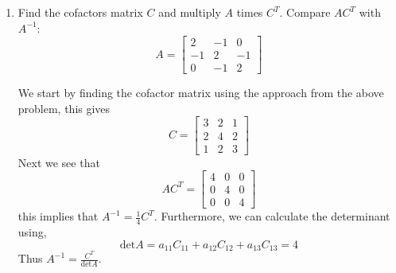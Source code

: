 \begin{enumerate}[label=\arabic*.]
    \item Find the cofactors matrix $C$ and multiply $A$ times $C^{T}$.
        Compare $AC^{T}$ with $A^{-1}$:
        \begin{equation}
            A =
            \begin{bmatrix}
                2 & -1 & 0 \\
                -1 & 2 & -1 \\
                0 & -1 & 2
             \end{bmatrix}
        \end{equation}
        \begin{mdframed}[style=MyFrame]
            We start by finding the cofactor matrix using the approach from
            the above problem, this gives
            \begin{equation}
                C = 
                \begin{bmatrix}
                    3   &   2   &   1   \\
                    2   &   4   &   2   \\
                    1   &   2   &   3
                \end{bmatrix}
            \end{equation}
            Next we see that
            \begin{equation}
                AC^{T} = 
                \begin{bmatrix}
                    4   &   0   &   0   \\
                    0   &   4   &   0   \\
                    0   &   0   &   4
                \end{bmatrix}
            \end{equation}
            this implies that $A^{-1} = \frac{1}{4}C^{T}$. Furthermore, we
            can calculate the determinant using,
            \begin{equation}
                \text{det}A = 
                    a_{11}C_{11} + a_{12}C_{12} + a_{13}C_{13}  = 4
            \end{equation}
            Thus $A^{-1} = \frac{C^{T}}{\text{det}A}$.
        \end{mdframed}
\end{enumerate}
